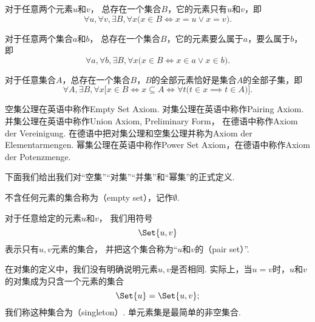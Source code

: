 \begin{axiom}[对集公理]\label{axiom:集合论.对集公理}
对于任意两个元素\(u\)和\(v\)，
总存在一个集合\(B\)，它的元素只有\(u\)和\(v\)，即\[
	\forall u, \forall v, \exists B, \forall x
	\bigl(
		x \in B \iff x = u \lor x = v
	\bigr).
\]
\end{axiom}

\begin{axiom}[并集公理I]
对于任意两个集合\(a\)和\(b\)，
总存在一个集合\(B\)，它的元素要么属于\(a\)，要么属于\(b\)，即\[
	\forall a, \forall b, \exists B, \forall x
	\bigl(
		x \in B
		\iff
		x \in a \lor x \in b
	\bigr).
\]
\end{axiom}

\begin{axiom}[幂集公理]
	对于任意集合\(A\)，总存在一个集合\(B\)，\(B\)的全部元素恰好是集合\(A\)的全部子集，即\[
	\forall A, \exists B, \forall x \bigl[
		x \in B
		\iff
		x \subseteq A
		\iff
		\forall t \bigl( t \in x \implies t \in A \bigr)
	\bigr].
\]
\end{axiom}


空集公理在英语中称作Empty Set Axiom.
对集公理在英语中称作Pairing Axiom.
并集公理在英语中称作Union Axiom, Preliminary Form，
在德语中称作Axiom der Vereinigung.
在德语中把对集公理和空集公理并称为Axiom der Elementarmengen.
幂集公理在英语中称作Power Set Axiom，在德语中称作Axiom der Potenzmenge.

下面我们给出我们对“空集”“对集”“并集”和“幂集”的正式定义.

\begin{definition}
不含任何元素的集合称为（empty set），记作\(\emptyset\).
\end{definition}

\begin{definition}
对于任意给定的元素\(u\)和\(v\)，
我们用符号\[
	\Set{ u, v }
\]表示只有\(u,v\)元素的集合，
并把这个集合称为“\(u\)和\(v\)的（pair set）”.
\end{definition}
在对集的定义中，我们没有明确说明元素\(u,v\)是否相同.
实际上，当\(u=v\)时，\(u\)和\(v\)的对集成为只含一个元素的集合\[
	\Set{ u } = \Set{ u, v };
\]
我们称这种集合为（singleton）.
单元素集是最简单的非空集合.

